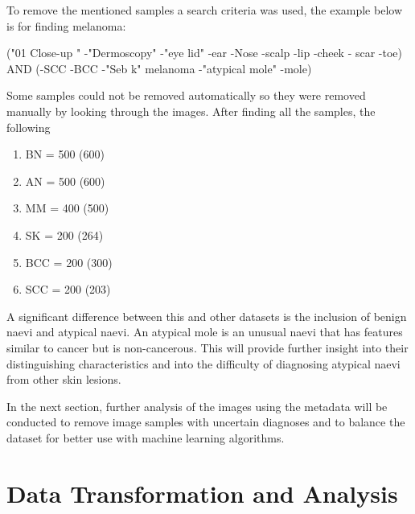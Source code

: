 To remove the mentioned samples a search criteria was used, the example below is for finding melanoma:

\begin{center}
	("01 Close-up " -"Dermoscopy" -"eye lid" -ear -Nose -scalp -lip -cheek - scar -toe) AND (-SCC -BCC -"Seb k" melanoma -"atypical mole" -mole)
\end{center}

Some samples could not be removed automatically so they were removed manually by looking through the images. After finding all the samples, the following

\begin{enumerate}
	\item BN = 500 (600)
	\item AN = 500 (600)
	\item MM = 400 (500)
	\item SK = 200 (264)
	\item BCC = 200 (300)
	\item SCC = 200 (203)
\end{enumerate}

A significant difference between this and other datasets is the inclusion of benign naevi and atypical naevi. An atypical mole is an unusual naevi that has features similar to cancer but is non-cancerous. This will provide further insight into their distinguishing characteristics and into the difficulty of diagnosing atypical naevi from other skin lesions.

In the next section, further analysis of the images using the metadata will be conducted to remove image samples with uncertain diagnoses and to balance the dataset for better use with machine learning algorithms.

\section{Data Transformation and Analysis}

